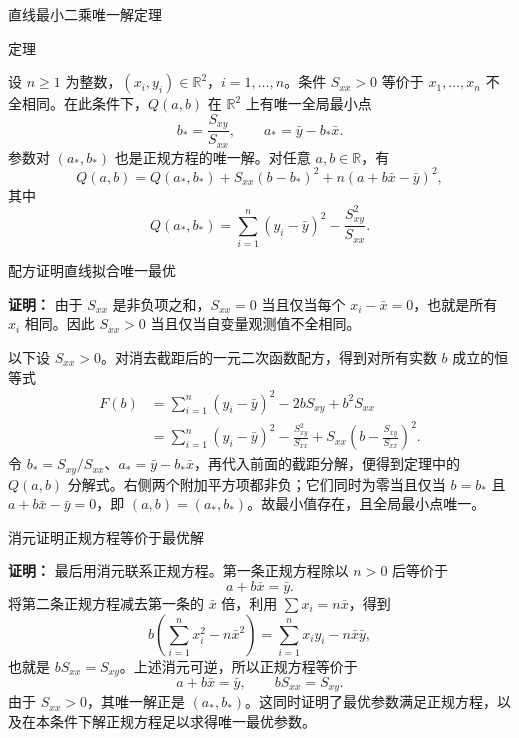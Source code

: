 \documentclass[aspectratio=169,10pt,fontset=fandol]{ctexbeamer}
\begin{document}
\begin{frame}[t,fragile]{直线最小二乘唯一解定理}
\footnotesize
\begin{block}{定理}
{\footnotesize
设 $n\geq1$ 为整数，$(x_i,y_i)\in\mathbb{R}^2$，$i=1,\ldots,n$。条件 $S_{xx}>0$ 等价于 $x_1,\ldots,x_n$ 不全相同。在此条件下，$Q(a,b)$ 在 $\mathbb{R}^2$ 上有唯一全局最小点
\[
b_* =\frac{S_{xy}}{S_{xx}},\qquad a_* =\bar{y}-b_*\bar{x}.
\]
参数对 $(a_*,b_*)$ 也是正规方程的唯一解。对任意 $a,b\in\mathbb{R}$，有
\[
Q(a,b)=Q(a_*,b_*)+S_{xx}(b-b_*)^2+n(a+b\bar{x}-\bar{y})^2,
\]
其中
\[
Q(a_*,b_*)=\sum_{i=1}^{n}(y_i-\bar{y})^2-\frac{S_{xy}^2}{S_{xx}}.
\]

}
\end{block}
\end{frame}
\begin{frame}[t,fragile]{配方证明直线拟合唯一最优}
\footnotesize
{\footnotesize
\textbf{证明：}
由于 $S_{xx}$ 是非负项之和，$S_{xx}=0$ 当且仅当每个 $x_i-\bar{x}=0$，也就是所有 $x_i$ 相同。因此 $S_{xx}>0$ 当且仅当自变量观测值不全相同。

以下设 $S_{xx}>0$。对消去截距后的一元二次函数配方，得到对所有实数 $b$ 成立的恒等式
\[
\begin{aligned}
F(b)
&=\sum_{i=1}^{n}(y_i-\bar{y})^2-2bS_{xy}+b^2S_{xx}\\
&=\sum_{i=1}^{n}(y_i-\bar{y})^2-\frac{S_{xy}^2}{S_{xx}}
  +S_{xx}\left(b-\frac{S_{xy}}{S_{xx}}\right)^2.
\end{aligned}
\]
令 $b_*=S_{xy}/S_{xx}$、$a_*=\bar{y}-b_*\bar{x}$，再代入前面的截距分解，便得到定理中的 $Q(a,b)$ 分解式。右侧两个附加平方项都非负；它们同时为零当且仅当 $b=b_*$ 且 $a+b\bar{x}-\bar{y}=0$，即 $(a,b)=(a_*,b_*)$。故最小值存在，且全局最小点唯一。


}
\end{frame}
\begin{frame}[t,fragile]{消元证明正规方程等价于最优解}
\footnotesize
{\footnotesize
\textbf{证明：}
最后用消元联系正规方程。第一条正规方程除以 $n>0$ 后等价于
\[
a+b\bar{x}=\bar{y}.
\]
将第二条正规方程减去第一条的 $\bar{x}$ 倍，利用 $\sum x_i=n\bar{x}$，得到
\[
b\left(\sum_{i=1}^{n}x_i^2-n\bar{x}^2\right)
=\sum_{i=1}^{n}x_i y_i-n\bar{x}\bar{y},
\]
也就是 $bS_{xx}=S_{xy}$。上述消元可逆，所以正规方程等价于
\[
a+b\bar{x}=\bar{y},\qquad bS_{xx}=S_{xy}.
\]
由于 $S_{xx}>0$，其唯一解正是 $(a_*,b_*)$。这同时证明了最优参数满足正规方程，以及在本条件下解正规方程足以求得唯一最优参数。

}
\end{frame}
\end{document}
